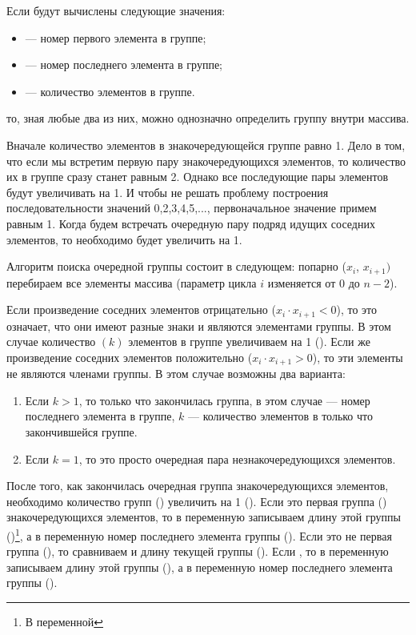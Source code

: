 
Если будут вычислены следующие значения:
\begin{itemize}
\item {} --- номер первого элемента в группе;
\item {} --- номер последнего элемента в группе;
\item {} --- количество элементов в группе.
\end{itemize}
то, зная любые два из них, можно однозначно определить группу внутри массива.

Вначале количество элементов в знакочередующейся группе равно 1. Дело в том, что если мы встретим первую пару
знакочередующихся элементов, то количество их в группе сразу станет равным 2. Однако все последующие пары элементов
будут увеличивать  на 1. И чтобы не решать проблему построения последовательности значений
 0,2,3,4,5,..., первоначальное значение  примем равным 1. Когда будем встречать
очередную пару подряд идущих соседних элементов, то  необходимо будет увеличить на 1.

Алгоритм поиска очередной группы состоит в следующем: попарно ($x_i$, $x_{i+1})$ перебираем все элементы массива
(параметр цикла $i$ изменяется от 0 до $n-2$). 

Если произведение соседних элементов отрицательно ($x_i\cdot x_{i+1} < 0$), то это означает, что они имеют разные знаки и
являются элементами группы. В этом случае количество $(k)$ элементов в группе увеличиваем на 1 ().
Если же произведение соседних элементов положительно ($x_i\cdot x_{i+1} > 0$), то эти элементы не являются членами
группы. В этом случае возможны два варианта:

\begin{enumerate}
\item Если  $k>1$, то только что закончилась группа, в этом случае  --- номер последнего элемента
в группе, $k$ --- количество элементов в только что закончившейся группе.
\item Если  $k=1$, то это просто очередная пара незнакочередующихся элементов.
\end{enumerate}
После того, как закончилась очередная группа знакочередующихся элементов, необходимо количество групп
() увеличить на 1 (). Если это первая группа ()
знакочередующихся элементов, то в переменную  записываем длину этой группы
()\footnote{В переменной}, а в переменную
 номер последнего элемента группы
(). Если это не первая группа
(), то сравниваем  и длину текущей группы
(). Если , то в переменную 
записываем длину этой группы (), а в переменную
 номер последнего элемента группы
(). 


